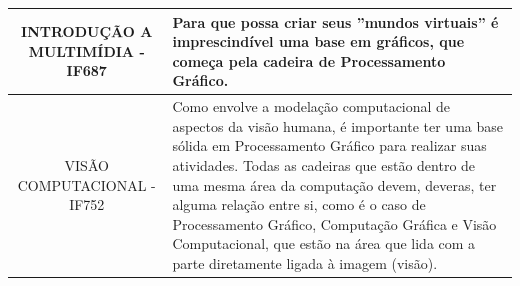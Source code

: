 \documentclass[10 pt,a4paper]{article}
\begin{document}
\begin{table}[H]
\begin{tabular}{@{}|l p{7cm}|@{}}
\multicolumn{1}{|c|}{INTRODUÇÃO A MULTIMÍDIA - IF687}                                          & Para que possa criar seus ''mundos virtuais'' é imprescindível uma base em gráficos, que começa pela cadeira de Processamento Gráfico.                                                                                                                                                                                                                           \\ \midrule
\multicolumn{1}{|c|}{VISÃO COMPUTACIONAL - IF752}                                              & Como envolve a modelação computacional de aspectos da visão humana, é importante ter uma base sólida em Processamento Gráfico para realizar suas atividades. Todas as cadeiras que estão dentro de uma mesma área da computação devem, deveras, ter alguma relação entre si, como é o caso de Processamento Gráfico, Computação Gráfica e Visão Computacional, que estão na área que lida com a parte diretamente ligada à imagem (visão). \\ \bottomrule 
\end{tabular}
\linebreak
\linebreak
\end{table}



\end{document}
